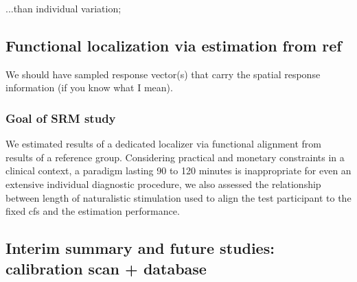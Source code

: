 ...than individual variation;




\subsection{Functional localization via estimation from ref}

%
We should have sampled response vector(s) that carry the spatial response
information (if you know what I mean).


\subsubsection{Goal of SRM study}
We estimated results of a dedicated localizer \citep{sengupta2016extension} via
functional alignment from results of a reference group.
Considering practical and monetary constraints in a clinical context, a paradigm
lasting 90 to 120 minutes is inappropriate for even an extensive individual
diagnostic procedure, we also assessed the relationship between length of
naturalistic stimulation used to align the test participant to the fixed
\ac{cfs} and the estimation performance.



\subsection{Interim summary and future studies: calibration scan + database}






